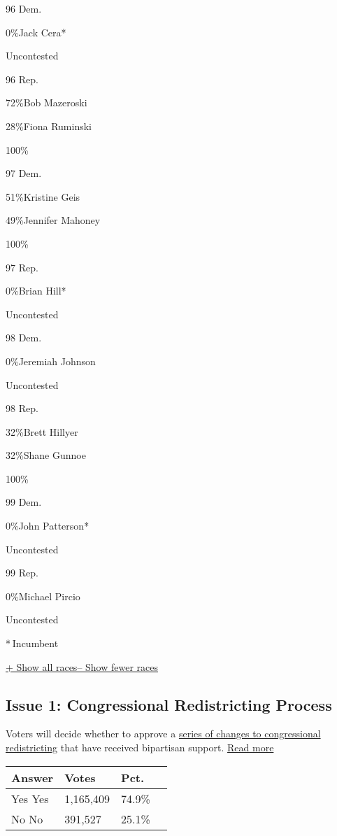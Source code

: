 96 Dem.

 0\%Jack Cera*

Uncontested

96 Rep.

 72\%Bob Mazeroski

 28\%Fiona Ruminski

100\%

97 Dem.

 51\%Kristine Geis

 49\%Jennifer Mahoney

100\%

97 Rep.

 0\%Brian Hill*

Uncontested

98 Dem.

 0\%Jeremiah Johnson

Uncontested

98 Rep.

 32\%Brett Hillyer

 32\%Shane Gunnoe

100\%

99 Dem.

 0\%John Patterson*

Uncontested

99 Rep.

 0\%Michael Pircio

Uncontested

* Incumbent~

\protect\hyperlink{}{+ Show all races-- Show fewer races}

\hypertarget{issue-1-congressional-redistricting-process}{%
\subsection{Issue 1: Congressional Redistricting
Process}\label{issue-1-congressional-redistricting-process}}

Voters will decide whether to approve a
\href{http://radio.wosu.org/post/what-you-need-know-about-issue-1-ohios-redistricting-proposal\#stream/0}{series
of changes to congressional redistricting} that have received bipartisan
support. \protect\hyperlink{}{Read more}

\begin{longtable}[]{@{}llll@{}}
\toprule
Answer & Votes & Pct. &\tabularnewline
\midrule
\endhead
 Yes Yes & 1,165,409 & 74.9\% &\tabularnewline
 No No & 391,527 & 25.1\% &\tabularnewline
\bottomrule
\end{longtable}

